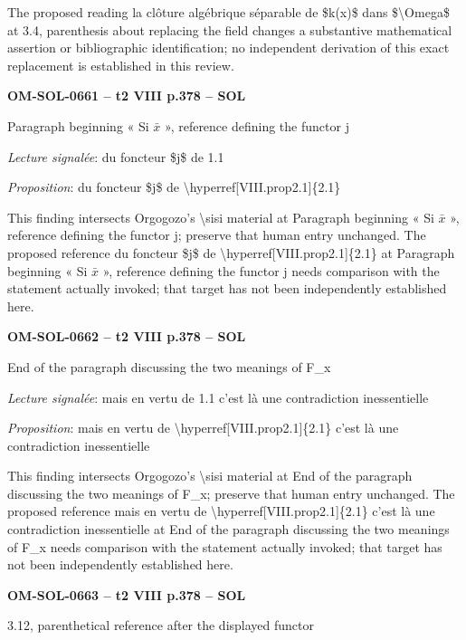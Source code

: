 The proposed reading la clôture algébrique séparable de \$k(x)\$ dans \$\textbackslash{}Omega\$ at 3.4, parenthesis about replacing the field changes a substantive mathematical assertion or bibliographic identification; no independent derivation of this exact replacement is established in this review.\par
\par\noindent\textbf{OM-SOL-0661 -- t2 VIII p.378 -- SOL}\par
Paragraph beginning « Si \ensuremath{\bar{x}} », reference defining the functor j\par
\emph{Lecture signalée}: du foncteur \$j\$ de 1.1\par
\emph{Proposition}: du foncteur \$j\$ de \textbackslash{}hyperref[VIII.prop2.1]\{2.1\}\par
This finding intersects Orgogozo's \textbackslash{}sisi material at Paragraph beginning « Si \ensuremath{\bar{x}} », reference defining the functor j; preserve that human entry unchanged. The proposed reference du foncteur \$j\$ de \textbackslash{}hyperref[VIII.prop2.1]\{2.1\} at Paragraph beginning « Si \ensuremath{\bar{x}} », reference defining the functor j needs comparison with the statement actually invoked; that target has not been independently established here.\par
\par\noindent\textbf{OM-SOL-0662 -- t2 VIII p.378 -- SOL}\par
End of the paragraph discussing the two meanings of F\_x\par
\emph{Lecture signalée}: mais en vertu de 1.1 c'est là une contradiction inessentielle\par
\emph{Proposition}: mais en vertu de \textbackslash{}hyperref[VIII.prop2.1]\{2.1\} c'est là une contradiction inessentielle\par
This finding intersects Orgogozo's \textbackslash{}sisi material at End of the paragraph discussing the two meanings of F\_x; preserve that human entry unchanged. The proposed reference mais en vertu de \textbackslash{}hyperref[VIII.prop2.1]\{2.1\} c'est là une contradiction inessentielle at End of the paragraph discussing the two meanings of F\_x needs comparison with the statement actually invoked; that target has not been independently established here.\par
\par\noindent\textbf{OM-SOL-0663 -- t2 VIII p.378 -- SOL}\par
3.12, parenthetical reference after the displayed functor\par
